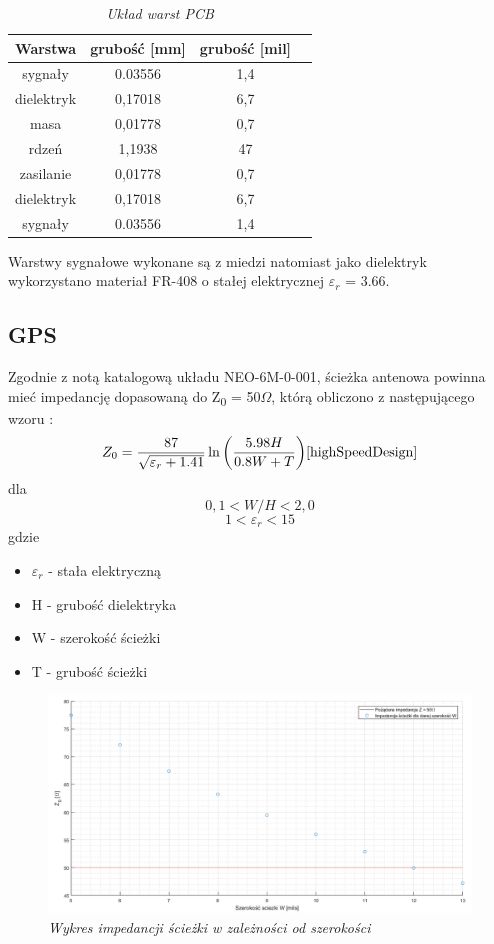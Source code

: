 \documentclass[eng,printmode]{mgr}
\begin{document}
\begin{table}[htb]
\def\arraystretch{1.3}%
\caption{\textit{ Układ warst PCB}}
\label{tab:pcbStack}
\begin{center}
\def\arraystretch{1.3}%
\begin{tabular}{ |c|c|c|c| }
\hline
Warstwa& grubość [mm] & grubość [mil] \\ 
\hline
sygnały & 0.03556 & 1,4 \\ 
\hline
dielektryk & 0,17018 & 6,7\\ 
\hline
masa & 0,01778 & 0,7\\ 
\hline
rdzeń & 1,1938 & 47\\ 
\hline
zasilanie & 0,01778 & 0,7\\ 
\hline
dielektryk & 0,17018 & 6,7\\ 
\hline
sygnały & 0.03556 & 1,4 \\ 
\hline
\end{tabular}
\end{center}
\end{table}

Warstwy sygnałowe wykonane są z miedzi natomiast jako dielektryk wykorzystano materiał FR-408 o stałej elektrycznej \textbf{$\varepsilon_r$} = 3.66.

\subsection*{GPS}
Zgodnie z notą katalogową układu NEO-6M-0-001, ścieżka antenowa powinna mieć impedancję dopasowaną do Z\textsubscript{0} = 50\textbf{$\Omega$}, którą obliczono z następującego wzoru :
\begin{equation}
Z_0= \frac{87}{\sqrt{\varepsilon_r + 1.41}}\ln{\left(\frac{5.98H}{0.8W + T}\right)} \label{eq:gps_z0} \cite{highSpeedDesign}
\end{equation}
dla 
$$
0,1 < W/H < 2,0
$$
$$
1 < \varepsilon_r < 15
$$
gdzie
\begin{itemize}
  \item \textbf{$\varepsilon_r$} - stała elektryczną 
  \item H - grubość dielektryka
  \item W - szerokość ścieżki
  \item T - grubość ścieżki
\end{itemize}
\newpage
\begin{figure}[!h]
    \centering
    \includegraphics[width=\textwidth]{plots/gpsZ0.png}
    \caption{\textit{ Wykres impedancji ścieżki w zależności od szerokości}}
\end{figure}
\end{document}
